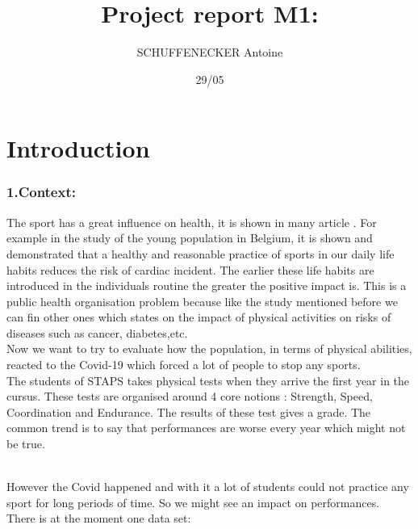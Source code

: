 \documentclass[
	12pt, %
]{fphw_assignment_toc}
\title{Project report M1:}        %
\author{SCHUFFENECKER Antoine}    %
\date{29/05}        %
\institute{}              %
\begin{document}
\maketitle
{}           %
\newpage
{}
\tableofcontents
\raggedbottom 
\newpage
{}          %


\section{\large\bf  Introduction~}\vspace{\dimexpr-40pt-\baselineskip+3cm}

\subsubsection{\large\bf1.Context:}\vspace{\dimexpr-40pt-\baselineskip+3cm}

\vspace{\dimexpr-40pt-\baselineskip+3cm}

The sport has a great influence on health, it is shown in many article . For example in the study of the young population in Belgium, it is shown and demonstrated that a healthy and reasonable practice of sports in our daily  life habits reduces the risk of cardiac incident. The earlier these life habits are introduced in the individuals routine the greater the positive impact is. This is a public health organisation problem because like the study mentioned before we can fin other ones which states on the impact of physical activities on risks of diseases such as cancer, diabetes,etc.
\\
Now we want to try to evaluate how the population, in terms of physical abilities, reacted to the Covid-19 which forced a lot of people to stop any sports.
\\
The students of STAPS takes physical tests when they arrive the first year in the cursus. These tests are organised around 4 core notions : Strength, Speed, Coordination and Endurance. The results of these test gives a grade. The common trend is to say that performances are worse every year which might not be true. 

\\ 
However the Covid happened and with it a lot of students could not practice any sport for long periods of time. So we might see an impact on performances.
\\
There is at the moment one data set:
\end{document}
